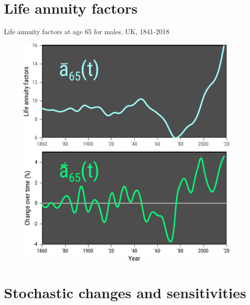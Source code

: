 \documentclass[10pt]{beamer}
\begin{document}
\section{Life annuity factors}

\begin{frame}{Life annuity factors at age 65 for males. UK, 1841-2018}
\begin{figure}
	\centering
	\hspace*{-0.8cm}
	\includegraphics[scale=1] {Fig1.pdf}
\end{figure}
\end{frame}



\section{Stochastic changes and sensitivities}
\end{document}
